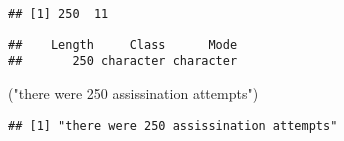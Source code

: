 \documentclass[
]{article}
\newenvironment{Shaded}{\begin{snugshade}}{\end{snugshade}}
\newcommand{\KeywordTok}[1]{\textcolor[rgb]{0.13,0.29,0.53}{\textbf{#1}}}
\newcommand{\NormalTok}[1]{#1}
\newcommand{\OperatorTok}[1]{\textcolor[rgb]{0.81,0.36,0.00}{\textbf{#1}}}
\newcommand{\StringTok}[1]{\textcolor[rgb]{0.31,0.60,0.02}{#1}}
\begin{document}
\begin{verbatim}
## [1] 250  11
\end{verbatim}

\begin{Shaded}
\end{Shaded}

\begin{verbatim}
##    Length     Class      Mode 
##       250 character character
\end{verbatim}

\begin{Shaded}
\begin{Highlighting}[]
\NormalTok{(}\StringTok{"there were 250 assissination attempts"}\NormalTok{)}
\end{Highlighting}
\end{Shaded}

\begin{verbatim}
## [1] "there were 250 assissination attempts"
\end{verbatim}

\begin{Shaded}
\end{Shaded}
\end{document}
